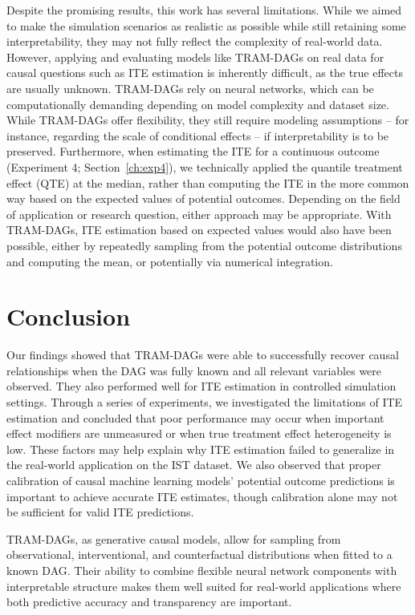 Despite the promising results, this work has several limitations. While we aimed to make the simulation scenarios as realistic as possible while still retaining some interpretability, they may not fully reflect the complexity of real-world data. However, applying and evaluating models like TRAM-DAGs on real data for causal questions such as ITE estimation is inherently difficult, as the true effects are usually unknown. TRAM-DAGs rely on neural networks, which can be computationally demanding depending on model complexity and dataset size. While TRAM-DAGs offer flexibility, they still require modeling assumptions -- for instance, regarding the scale of conditional effects -- if interpretability is to be preserved. 
Furthermore, when estimating the ITE for a continuous outcome (Experiment 4; Section~\ref{ch:exp4}), we technically applied the quantile treatment effect (QTE) at the median, rather than computing the ITE in the more common way based on the expected values of potential outcomes. Depending on the field of application or research question, either approach may be appropriate. With TRAM-DAGs, ITE estimation based on expected values would also have been possible, either by repeatedly sampling from the potential outcome distributions and computing the mean, or potentially via numerical integration.


\section{Conclusion}


Our findings showed that TRAM-DAGs were able to successfully recover causal relationships when the DAG was fully known and all relevant variables were observed. They also performed well for ITE estimation in controlled simulation settings. Through a series of experiments, we investigated the limitations of ITE estimation and concluded that poor performance may occur when important effect modifiers are unmeasured or when true treatment effect heterogeneity is low. These factors may help explain why ITE estimation failed to generalize in the real-world application on the IST dataset. We also observed that proper calibration of causal machine learning models' potential outcome predictions is important to achieve accurate ITE estimates, though calibration alone may not be sufficient for valid ITE predictions.

TRAM-DAGs, as generative causal models, allow for sampling from observational, interventional, and counterfactual distributions when fitted to a known DAG. Their ability to combine flexible neural network components with interpretable structure makes them well suited for real-world applications where both predictive accuracy and transparency are important.

